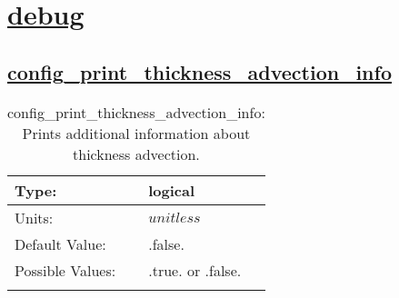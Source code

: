 \section[debug]{\hyperref[sec:nm_tab_debug]{debug}}
\label{sec:nm_sec_debug}
\subsection[config\_print\_thickness\_advection\_info]{\hyperref[sec:nm_tab_debug]{config\_print\_thickness\_advection\_info}}
\label{subsec:nm_sec_config_print_thickness_advection_info}
\begin{center}
\begin{longtable}{| p{2.0in} | p{4.0in} |}
    \hline
    Type: & logical \\
    \hline
    Units: & $unitless$ \\
    \hline
    Default Value: & .false. \\
    \hline
    Possible Values: & .true. or .false. \\
    \hline
    \caption{config\_print\_thickness\_advection\_info: Prints additional information about thickness advection.}
\end{longtable}
\end{center}
